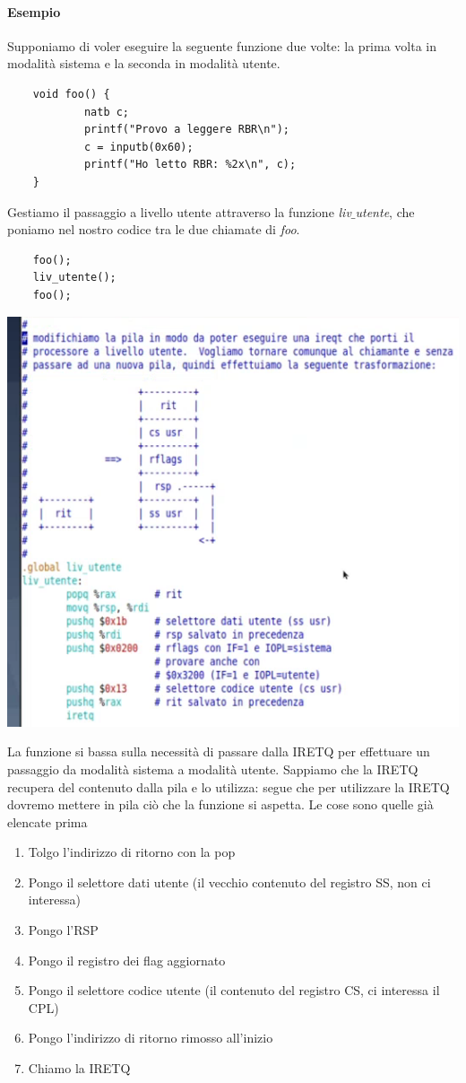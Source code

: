\documentclass[11pt]{report}
\theoremstyle{definition}
\begin{document}
\paragraph{Esempio} Supponiamo di voler eseguire la seguente funzione due volte: la prima volta in modalità sistema e la seconda in modalità utente.
\begin{verbatim}
	void foo() {
		    natb c;
		    printf("Provo a leggere RBR\n");
		    c = inputb(0x60);
		    printf("Ho letto RBR: %2x\n", c);
	}
\end{verbatim}
Gestiamo il passaggio a livello utente attraverso la funzione \emph{liv$\_$utente}, che poniamo nel nostro codice tra le due chiamate di \emph{foo}.
\begin{verbatim}
	foo();
	liv_utente();
	foo();
\end{verbatim}
\begin{center}\includegraphics{img/122.PNG}\end{center}
La funzione si bassa sulla necessità di passare dalla IRETQ per effettuare un passaggio da modalità sistema a modalità utente. Sappiamo che la IRETQ recupera del contenuto dalla pila e lo utilizza: segue che per utilizzare la IRETQ dovremo mettere in pila ciò che la funzione si aspetta. Le cose sono quelle già elencate prima
\begin{enumerate}
	\item Tolgo l'indirizzo di ritorno con la pop
	\item Pongo il selettore dati utente (il vecchio contenuto del registro SS, non ci interessa)
	\item Pongo l'RSP
	\item Pongo il registro dei flag aggiornato
	\item Pongo il selettore codice utente (il contenuto del registro CS, ci interessa il CPL)
	\item Pongo l'indirizzo di ritorno rimosso all'inizio
	\item Chiamo la IRETQ
\end{enumerate}
\end{document}
